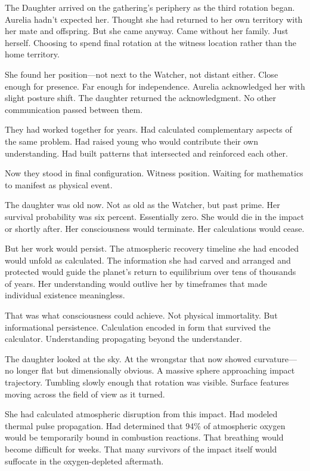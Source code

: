 \scenebreak

The Daughter arrived on the gathering's periphery as the third rotation began. Aurelia hadn't expected her. Thought she had returned to her own territory with her mate and offspring. But she came anyway. Came without her family. Just herself. Choosing to spend final rotation at the witness location rather than the home territory.

She found her position—not next to the Watcher, not distant either. Close enough for presence. Far enough for independence. Aurelia acknowledged her with slight posture shift. The daughter returned the acknowledgment. No other communication passed between them.

They had worked together for years. Had calculated complementary aspects of the same problem. Had raised young who would contribute their own understanding. Had built patterns that intersected and reinforced each other.

Now they stood in final configuration. Witness position. Waiting for mathematics to manifest as physical event.

The daughter was old now. Not as old as the Watcher, but past prime. Her survival probability was six percent. Essentially zero. She would die in the impact or shortly after. Her consciousness would terminate. Her calculations would cease.

But her work would persist. The atmospheric recovery timeline she had encoded would unfold as calculated. The information she had carved and arranged and protected would guide the planet's return to equilibrium over tens of thousands of years. Her understanding would outlive her by timeframes that made individual existence meaningless.

That was what consciousness could achieve. Not physical immortality. But informational persistence. Calculation encoded in form that survived the calculator. Understanding propagating beyond the understander.

The daughter looked at the sky. At the wrongstar that now showed curvature—no longer flat but dimensionally obvious. A massive sphere approaching impact trajectory. Tumbling slowly enough that rotation was visible. Surface features moving across the field of view as it turned.

She had calculated atmospheric disruption from this impact. Had modeled thermal pulse propagation. Had determined that 94\% of atmospheric oxygen would be temporarily bound in combustion reactions. That breathing would become difficult for weeks. That many survivors of the impact itself would suffocate in the oxygen-depleted aftermath.

